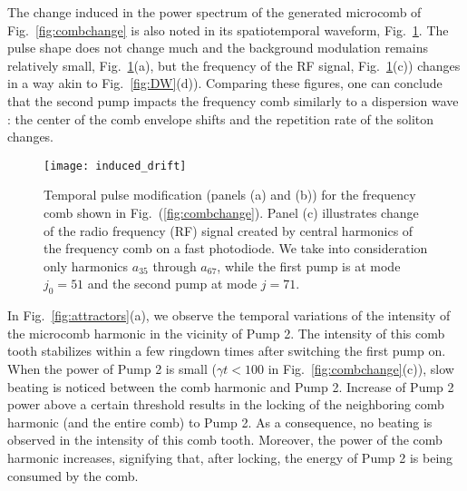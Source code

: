 The change induced in the power spectrum of the generated microcomb of Fig.~\ref{fig:combchange} is also noted in its spatiotemporal waveform, Fig.~\ref{fig:drift}. The pulse shape does not change much and the background modulation remains relatively small, Fig.~\ref{fig:drift}(a), but the frequency of the RF signal, Fig.~\ref{fig:drift}(c)) changes in a way akin to Fig.~\ref{fig:DW}(d)). Comparing these figures, one can conclude that the second pump impacts the frequency comb similarly to a dispersion wave \cite{taheri2016highorderdisp}: the center of the comb envelope shifts and the repetition rate of the soliton changes.
%
\begin{figure}[tbp]
  \centering
  \texttt{[image: induced\_drift]}
\caption{ \small Temporal pulse modification (panels (a) and (b)) for the frequency comb shown in Fig.~(\ref{fig:combchange}). Panel (c) illustrates change of the radio frequency (RF) signal created by central harmonics of the frequency comb on a fast photodiode. We take into consideration only harmonics $a_{35}$ through $a_{67}$, while the first pump is at mode $j_0=51$ and the second pump at mode $j=71$.
} \label{fig:drift}
\end{figure}
%

In Fig.~\ref{fig:attractors}(a), we observe the temporal variations of the intensity of the microcomb harmonic in the vicinity of Pump 2. The intensity of this comb tooth stabilizes within a few ringdown times after switching the first pump on. When the power of Pump 2 is small ($\gamma t < 100$ in Fig.~\ref{fig:combchange}(c)), slow beating is noticed between the comb harmonic and Pump 2. Increase of Pump 2 power above a certain threshold results in the locking of the neighboring comb harmonic (and the entire comb) to Pump 2. As a consequence, no beating is observed in the intensity of this comb tooth. Moreover, the power of the comb harmonic increases, signifying that, after locking, the energy of Pump 2 is being consumed by the comb.

